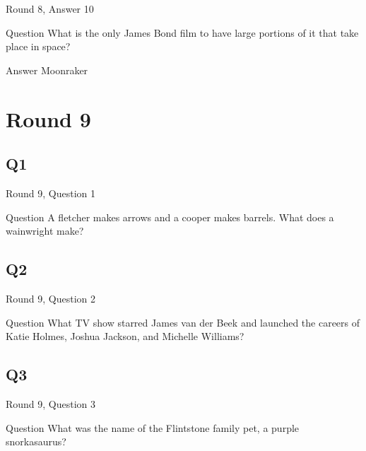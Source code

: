 \documentclass[11pt]{beamer}
\begin{document}
\begin{frame}[t]{Round 8, Answer 10}
\vspace{2em}
\begin{block}{Question}
What is the only James Bond film to have large portions of it that take place in space\@?
\end{block}
\pause{}
\begin{block}{Answer}
Moonraker
\end{block}
\end{frame}
    

\section{Round 9}
    

\subsection*{Q1}
\begin{frame}[t]{Round 9, Question 1}
\vspace{2em}
\begin{block}{Question}
A fletcher makes arrows and a cooper makes barrels. What does a wainwright make\@?
\end{block}
\end{frame}
    

\subsection*{Q2}
\begin{frame}[t]{Round 9, Question 2}
\vspace{2em}
\begin{block}{Question}
What TV show starred James van der Beek and launched the careers of Katie Holmes, Joshua Jackson, and Michelle Williams\@?
\end{block}
\end{frame}
    

\subsection*{Q3}
\begin{frame}[t]{Round 9, Question 3}
\vspace{2em}
\begin{block}{Question}
What was the name of the Flintstone family pet, a purple snorkasaurus\@?
\end{block}
\end{frame}
    
\end{document}
